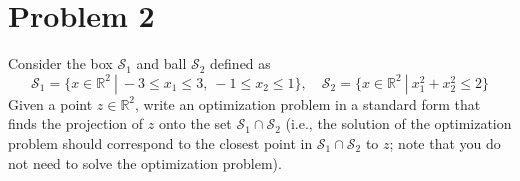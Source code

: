 \section*{Problem 2}
Consider the  box $\mathcal S_1$ and ball $\mathcal S_2$ defined as
\begin{equation}
\mathcal S_1=\{x\in\mathbb R^2 \ |\ -3\leq x_1\leq 3,\ -1\leq x_2\leq 1\},\quad \mathcal S_2=\{x\in\mathbb R^2 \ |\  x_1^2+x_2^2\leq 2\}
\end{equation}
Given a point $z\in\mathbb R^2$, write an optimization problem in a standard form that finds the projection of $z$ onto the set $\mathcal S_1\cap \mathcal S_2$ (i.e., the solution of the optimization problem should correspond to the closest point in $\mathcal S_1\cap \mathcal S_2$ to $z$; note that you do not need to solve the optimization problem).